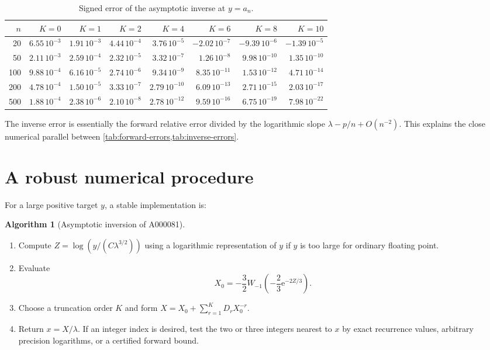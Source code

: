 \documentclass[11pt,a4paper,oneside,openany]{book}
\theoremstyle{definition}
\newtheorem{algorithm}[theorem]{Algorithm}
\theoremstyle{remark}
\newcommand{\e}{\mathrm e}
\begin{document}
\begin{table}[htbp]
\centering
\caption{Signed error of the asymptotic inverse at $y=a_n$.}
\label{tab:inverse-errors}
\begingroup
\scriptsize
\setlength{\tabcolsep}{3.1pt}
\begin{tabular}{r*{7}{r}}
\toprule
$n$ & $K=0$ & $K=1$ & $K=2$ & $K=4$ & $K=6$ & $K=8$ & $K=10$\\
\midrule
20  & $6.55\,10^{-3}$ & $1.91\,10^{-3}$ & $4.44\,10^{-4}$ & $3.76\,10^{-5}$ & $-2.02\,10^{-7}$ & $-9.39\,10^{-6}$ & $-1.39\,10^{-5}$\\
50  & $2.11\,10^{-3}$ & $2.59\,10^{-4}$ & $2.32\,10^{-5}$ & $3.32\,10^{-7}$ & $1.26\,10^{-8}$ & $9.98\,10^{-10}$& $1.35\,10^{-10}$\\
100 & $9.88\,10^{-4}$ & $6.16\,10^{-5}$ & $2.74\,10^{-6}$ & $9.34\,10^{-9}$ & $8.35\,10^{-11}$& $1.53\,10^{-12}$& $4.71\,10^{-14}$\\
200 & $4.78\,10^{-4}$ & $1.50\,10^{-5}$ & $3.33\,10^{-7}$ & $2.79\,10^{-10}$& $6.09\,10^{-13}$& $2.71\,10^{-15}$& $2.03\,10^{-17}$\\
500 & $1.88\,10^{-4}$ & $2.38\,10^{-6}$ & $2.10\,10^{-8}$ & $2.78\,10^{-12}$& $9.59\,10^{-16}$& $6.75\,10^{-19}$& $7.98\,10^{-22}$\\
\bottomrule
\end{tabular}
\endgroup
\end{table}

The inverse error is essentially the forward relative error divided by the
logarithmic slope $\lambda-p/n+O(n^{-2})$.  This explains the close numerical
parallel between \cref{tab:forward-errors,tab:inverse-errors}.

\section{A robust numerical procedure}
For a large positive target $y$, a stable implementation is:
\begin{algorithm}[Asymptotic inversion of A000081]
\leavevmode
\begin{enumerate}
\item Compute $Z=\log(y/(C\lambda^{3/2}))$ using a logarithmic representation of
      $y$ if $y$ is too large for ordinary floating point.
\item Evaluate
\[
 X_0=-\frac32W_{-1}\!\left(-\frac23\e^{-2Z/3}\right).
\]
\item Choose a truncation order $K$ and form
$X=X_0+\sum_{r=1}^{K}D_rX_0^{-r}$.
\item Return $x=X/\lambda$.  If an integer index is desired, test the two or
      three integers nearest to $x$ by exact recurrence values, arbitrary
      precision logarithms, or a certified forward bound.
\end{enumerate}
\end{algorithm}
\end{document}

